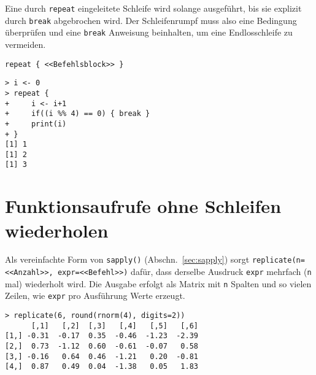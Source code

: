 Eine durch \lstinline!repeat! eingeleitete Schleife wird solange ausgeführt, bis sie explizit durch \lstinline!break! abgebrochen wird. Der Schleifenrumpf muss also eine Bedingung überprüfen und eine \lstinline!break! Anweisung beinhalten, um eine Endlosschleife zu vermeiden.
\begin{lstlisting}
repeat { <<Befehlsblock>> }
\end{lstlisting}

\begin{lstlisting}
> i <- 0
> repeat {
+     i <- i+1
+     if((i %% 4) == 0) { break }
+     print(i)
+ }
[1] 1
[1] 2
[1] 3
\end{lstlisting}

\section{Funktionsaufrufe ohne Schleifen wiederholen}
\label{sec:replicate}

Als vereinfachte Form von \lstinline!sapply()! (Abschn.\ \ref{sec:sapply}) sorgt  \lstinline!replicate(n=<<Anzahl>>, expr=<<Befehl>>)! dafür, dass derselbe Ausdruck \lstinline!expr! mehrfach (\lstinline!n! mal) wiederholt wird. Die Ausgabe erfolgt als Matrix mit \lstinline!n! Spalten und so vielen Zeilen, wie \lstinline!expr! pro Ausführung Werte erzeugt.
\begin{lstlisting}
> replicate(6, round(rnorm(4), digits=2))
      [,1]   [,2]  [,3]   [,4]   [,5]   [,6]
[1,] -0.31  -0.17  0.35  -0.46  -1.23  -2.39
[2,]  0.73  -1.12  0.60  -0.61  -0.07   0.58
[3,] -0.16   0.64  0.46  -1.21   0.20  -0.81
[4,]  0.87   0.49  0.04  -1.38   0.05   1.83
\end{lstlisting}

